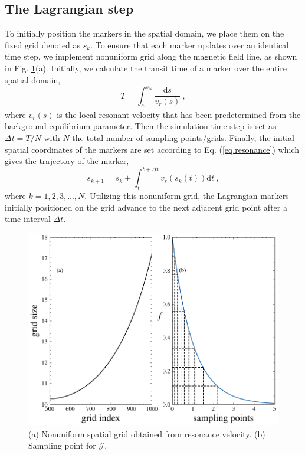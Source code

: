\documentclass[times,12pt,3p,longtitle]{elsarticle}
\begin{document}

\subsection{The Lagrangian step}

To initially position the markers in the spatial domain, we place them on the fixed grid denoted as $s_k$.
To ensure that each marker updates over an identical time step, we implement nonuniform grid along the magnetic field line, as shown in Fig. \ref{fig.uni_grid}(a).
Initially, we calculate the transit time of a marker over the entire spatial domain,
\begin{equation}
    T = \int_{s_1}^{s_N} \frac{\mathrm{d}s}{v_r(s)}~,
\end{equation}
where $v_r(s)$ is the local resonant velocity that has been predetermined from the background equilibrium parameter.
Then the simulation time step is set as $\Delta t = T/N$ with $N$ the total number of sampling points/grids.
Finally, the initial spatial coordinates of the markers are set according to Eq. (\ref{eq.resonance}) which gives the trajectory of the marker,
\begin{equation}
    s_{k+1} = s_k +  \int_{t}^{t+\Delta t} v_r(s_k(t)) \mathrm{d}t~,
\end{equation}
where $k=1,2,3,...,N$.
Utilizing this nonuniform grid, the Lagrangian markers initially positioned on the grid advance to the next adjacent grid point after a time interval $\Delta t$.
\begin{figure}[htbp]
    \centering
    \includegraphics[scale=0.5]{fig_nu_grid.pdf}
    \caption{(a) Nonuniform spatial grid obtained from resonance velocity.
    (b) Sampling point for $\mathcal{J}$.
    }
    \label{fig.uni_grid}
\end{figure}
\end{document}
